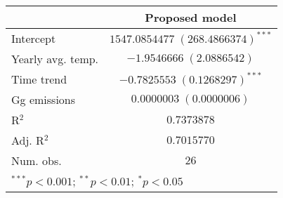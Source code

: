 \documentclass{article}
\begin{document}
\thispagestyle{empty}
\begin{table}
\begin{center}
\begin{tabular}{l c}
\toprule
 & Proposed model \\
\midrule
Intercept         & $1547.0854477 \; (268.4866374)^{***}$ \\
Yearly avg. temp. & $-1.9546666 \;   (2.0886542)$         \\
Time trend        & $-0.7825553 \;   (0.1268297)^{***}$   \\
Gg emissions      & $0.0000003 \;   (0.0000006)$          \\
\midrule
R$^2$             & $0.7373878$                           \\
Adj. R$^2$        & $0.7015770$                           \\
Num. obs.         & $26$                                  \\
\bottomrule
\multicolumn{2}{l}{\scriptsize{$^{***}p<0.001$; $^{**}p<0.01$; $^{*}p<0.05$}}
\end{tabular}
\end{center}
\end{table}
\end{document}
